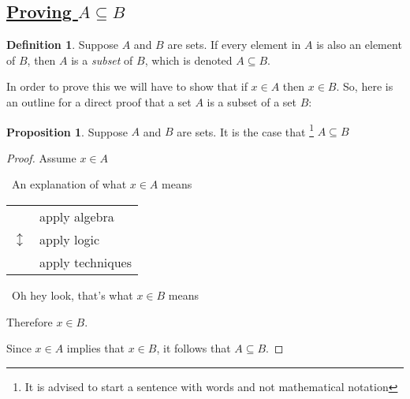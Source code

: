 \documentclass{amsart} %
\theoremstyle{definition} %
\newtheorem*{dfn}{Definition} %
\theoremstyle{proposition} %
\newtheorem*{prpn}{Proposition}
\theoremstyle{remark} %
\begin{document}
\bigskip \bigskip \bigskip

\subsection{\underline{Proving $A \subseteq B$}}

\begin{dfn}
\boxed{\subseteq} \quad Suppose $A$ and $B$ are sets. If every element in $A$ is also an element of $B$, then $A$ is a \emph{subset} of $B$, which is denoted $A \subseteq B$.
\end{dfn}

In order to prove this we will have to show that if $x \in A$ then $x \in B$. So, here is an outline for a direct proof that a set $A$ is a subset of a set $B$:

\begin{prpn}
Suppose $A$ and $B$ are sets. It is the case that \footnote{It is advised to start a sentence with words and not mathematical notation} $A \subseteq B$
\end{prpn}

\begin{proof}
Assume $x \in A$

      \begin{center}
            \guillemotleft\ An explanation of what $ x \in A$ means \guillemotright
      \end{center}

      \begin{center}
      \begin{tabular}{r l}
            \multirow{3}{*}{\huge $\updownarrow$} & apply algebra \\ %
            & apply logic \\
            & apply techniques \\
      \end{tabular}
      \end{center}

      \begin{center}
            \guillemotleft\ Oh hey look, that's what $x \in B$ means \guillemotright
      \end{center}

      Therefore $x \in B$.

      Since $x \in A$ implies that $x \in B$, it follows that $A \subseteq B$.

\end{proof}
\end{document}
